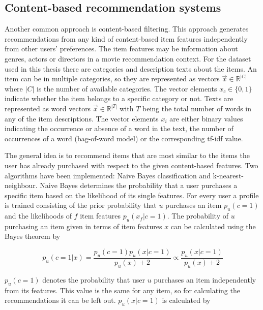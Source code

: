 \documentclass[10pt]{reportMaster}
\begin{document}
\subsection{Content-based recommendation systems} %
\label{rs_cb}
Another common approach is content-based filtering.
This approach generates recommendations from any kind of content-based item features independently from other users' preferences.
The item features may be information about genres, actors or directors in a movie recommendation context.
For the dataset used in this thesis there are categories and description texts about the items.
An item can be in multiple categories, so they are represented as vectors $\vec{x} \in \mathds{R}^{|C|}$ where $|C|$ is the number of available categories.
The vector elements $x_c \in \{0,1\}$ indicate whether the item belongs to a specific category or not. 
Texts are represented as word vectors $\vec{x} \in \mathds{R}^{|T|}$ with $T$ being the total number of words in any of the item descriptions.
The vector elements $x_i$ are either binary values indicating the occurrence or absence of a word in the text, the number of occurrences of a word (bag-of-word model) or the corresponding tf-idf value. %

The general idea is to recommend items that are most similar to the items the user has already purchased with respect to the given content-based features.
Two algorithms have been implemented: Naive Bayes classification and k-nearest-neighbour. %
Naive Bayes determines the probability that a user purchases a specific item based on the likelihood of its single features.
For every user a profile is trained consisting of the prior probability that $u$ purchases an item $p_u(c=1)$ and  the likelihoods of $f$ item features $p_u(x_f|c=1)$.
The probability of $u$ purchasing an item given in terms of item features $x$ can be calculated using the Bayes theorem by 

\begin{equation}
\label{BayesPost}
	p_u(c=1|x) = \frac{p_u(c=1) p_u(x|c=1)}{p_u(x)+2} \propto \frac{p_u(x|c=1)}{p_u(x)+2}
\end{equation}

$p_u(c=1)$ denotes the probability that user $u$ purchases an item independently from its features.
This value is the same for any item, so for calculating the recommendations it can be left out.
$p_u(x|c=1)$ is calculated by 
\end{document}
